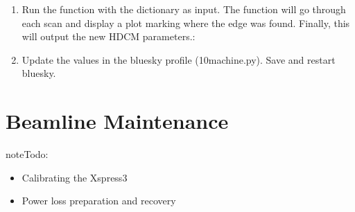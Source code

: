 \documentclass[letterpaper,10pt,english]{sphinxmanual}
\begin{document}
\begin{description}
\begin{enumerate}
\begin{sphinxVerbatim}[commandchars=\\\{\}]
 \PYG{p}{[}\PYG{p}{]}     
                               
                               
                               
                               
                               
\end{sphinxVerbatim}

\item {} 
\sphinxAtStartPar
Run the  function with the dictionary as input. The function will go through each scan and display a plot marking where the edge was found. Finally, this will output the new HDCM parameters.:

\begin{sphinxVerbatim}[commandchars=\\\{\}]
 \PYG{p}{[}\PYG{p}{]}  
\end{sphinxVerbatim}

\item {} 
\sphinxAtStartPar
Update the values in the bluesky profile (10\sphinxhyphen{}machine.py). Save and restart bluesky.

\end{enumerate}

\end{description}


\section{Beamline Maintenance}
\label{\detokenize{staff:beamline-maintenance}}
\begin{sphinxadmonition}{note}{\label{\detokenize{staff:id3}}Todo:}\begin{itemize}
\item {} 
\sphinxAtStartPar
Calibrating the Xspress3

\item {} 
\sphinxAtStartPar
Power loss preparation and recovery

\end{itemize}
\end{sphinxadmonition}
\end{document}
